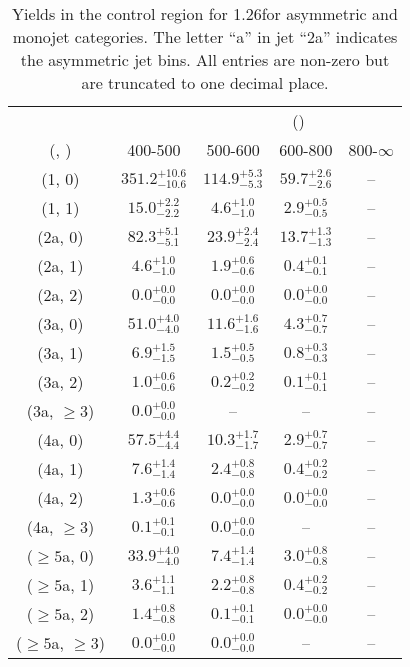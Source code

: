 \begin{table}[h!]
\tiny
\centering
\caption{Yields in the \gj control region for 1.26\ifb for asymmetric and monojet categories. The letter ``a'' in jet \eg ``2a''  indicates the asymmetric jet bins. All entries are non-zero but are truncated to one decimal place.\label{tab:yieldssep_ewk_gj_asym}}
\begin{tabular}
{ccccc}
	\hline\hline
&	& \multicolumn{4}{c}{\scalht (\gev)} \\ 
	 (\njet,  \nb) & 400-500 & 500-600 & 600-800 & 800-$\infty$ \\ [0.8ex] 
\hline
	(1, 0) & $351.2^{+ 10.6 }_{- 10.6 }$ & $114.9^{+ 5.3 }_{- 5.3 }$ & $59.7^{+ 2.6 }_{- 2.6 }$ & -- \\[0.5ex] 
	(1, 1) & $15.0^{+ 2.2 }_{- 2.2 }$ & $4.6^{+ 1.0 }_{- 1.0 }$ & $2.9^{+ 0.5 }_{- 0.5 }$ & -- \\[0.5ex] 
	(2a, 0) & $82.3^{+ 5.1 }_{- 5.1 }$ & $23.9^{+ 2.4 }_{- 2.4 }$ & $13.7^{+ 1.3 }_{- 1.3 }$ & -- \\[0.5ex] 
	(2a, 1) & $4.6^{+ 1.0 }_{- 1.0 }$ & $1.9^{+ 0.6 }_{- 0.6 }$ & $0.4^{+ 0.1 }_{- 0.1 }$ & -- \\[0.5ex] 
	(2a, 2) & $0.0^{+ 0.0 }_{- 0.0 }$ & $0.0^{+ 0.0 }_{- 0.0 }$ & $0.0^{+ 0.0 }_{- 0.0 }$ & -- \\[0.5ex] 
	(3a, 0) & $51.0^{+ 4.0 }_{- 4.0 }$ & $11.6^{+ 1.6 }_{- 1.6 }$ & $4.3^{+ 0.7 }_{- 0.7 }$ & -- \\[0.5ex] 
	(3a, 1) & $6.9^{+ 1.5 }_{- 1.5 }$ & $1.5^{+ 0.5 }_{- 0.5 }$ & $0.8^{+ 0.3 }_{- 0.3 }$ & -- \\[0.5ex] 
	(3a, 2) & $1.0^{+ 0.6 }_{- 0.6 }$ & $0.2^{+ 0.2 }_{- 0.2 }$ & $0.1^{+ 0.1 }_{- 0.1 }$ & -- \\[0.5ex] 
	(3a, $\ge3$) & $0.0^{+ 0.0 }_{- 0.0 }$ & -- & -- & -- \\[0.5ex] 
	(4a, 0) & $57.5^{+ 4.4 }_{- 4.4 }$ & $10.3^{+ 1.7 }_{- 1.7 }$ & $2.9^{+ 0.7 }_{- 0.7 }$ & -- \\[0.5ex] 
	(4a, 1) & $7.6^{+ 1.4 }_{- 1.4 }$ & $2.4^{+ 0.8 }_{- 0.8 }$ & $0.4^{+ 0.2 }_{- 0.2 }$ & -- \\[0.5ex] 
	(4a, 2) & $1.3^{+ 0.6 }_{- 0.6 }$ & $0.0^{+ 0.0 }_{- 0.0 }$ & $0.0^{+ 0.0 }_{- 0.0 }$ & -- \\[0.5ex] 
	(4a, $\ge3$) & $0.1^{+ 0.1 }_{- 0.1 }$ & $0.0^{+ 0.0 }_{- 0.0 }$ & -- & -- \\[0.5ex] 
	($\ge5$a, 0) & $33.9^{+ 4.0 }_{- 4.0 }$ & $7.4^{+ 1.4 }_{- 1.4 }$ & $3.0^{+ 0.8 }_{- 0.8 }$ & -- \\[0.5ex] 
	($\ge5$a, 1) & $3.6^{+ 1.1 }_{- 1.1 }$ & $2.2^{+ 0.8 }_{- 0.8 }$ & $0.4^{+ 0.2 }_{- 0.2 }$ & -- \\[0.5ex] 
	($\ge5$a, 2) & $1.4^{+ 0.8 }_{- 0.8 }$ & $0.1^{+ 0.1 }_{- 0.1 }$ & $0.0^{+ 0.0 }_{- 0.0 }$ & -- \\[0.5ex] 
	($\ge5$a, $\ge3$) & $0.0^{+ 0.0 }_{- 0.0 }$ & $0.0^{+ 0.0 }_{- 0.0 }$ & -- & -- \\[0.5ex] 
	\hline
	\hline
\end{tabular}
\end{table}

